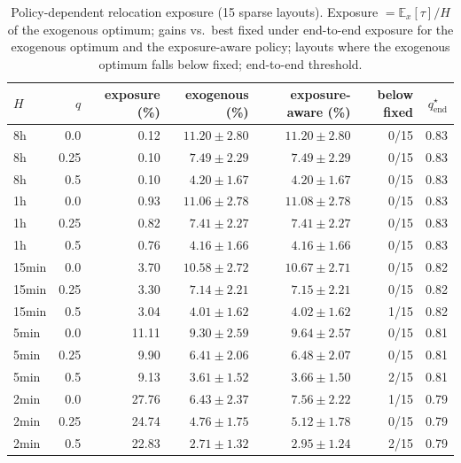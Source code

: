 \begin{table}[h]\centering\caption{Policy-dependent relocation exposure (15 sparse layouts). Exposure $=\mathbb{E}_x[\tau]/H$ of the exogenous optimum; gains vs.\ best fixed under end-to-end exposure for the exogenous optimum and the exposure-aware policy; layouts where the exogenous optimum falls below fixed; end-to-end threshold.}\label{tab:s-reloc}\scriptsize
\begin{tabular}{@{}lrrrrrr@{}}\toprule $H$ & $q$ & exposure (\%) & exogenous (\%) & exposure-aware (\%) & below fixed & $q^\star_{\mathrm{end}}$\\\midrule
8h & 0.0 & 0.12 & $11.20\pm2.80$ & $11.20\pm2.80$ & 0/15 & 0.83\\
8h & 0.25 & 0.10 & $7.49\pm2.29$ & $7.49\pm2.29$ & 0/15 & 0.83\\
8h & 0.5 & 0.10 & $4.20\pm1.67$ & $4.20\pm1.67$ & 0/15 & 0.83\\
1h & 0.0 & 0.93 & $11.06\pm2.78$ & $11.08\pm2.78$ & 0/15 & 0.83\\
1h & 0.25 & 0.82 & $7.41\pm2.27$ & $7.41\pm2.27$ & 0/15 & 0.83\\
1h & 0.5 & 0.76 & $4.16\pm1.66$ & $4.16\pm1.66$ & 0/15 & 0.83\\
15min & 0.0 & 3.70 & $10.58\pm2.72$ & $10.67\pm2.71$ & 0/15 & 0.82\\
15min & 0.25 & 3.30 & $7.14\pm2.21$ & $7.15\pm2.21$ & 0/15 & 0.82\\
15min & 0.5 & 3.04 & $4.01\pm1.62$ & $4.02\pm1.62$ & 1/15 & 0.82\\
5min & 0.0 & 11.11 & $9.30\pm2.59$ & $9.64\pm2.57$ & 0/15 & 0.81\\
5min & 0.25 & 9.90 & $6.41\pm2.06$ & $6.48\pm2.07$ & 0/15 & 0.81\\
5min & 0.5 & 9.13 & $3.61\pm1.52$ & $3.66\pm1.50$ & 2/15 & 0.81\\
2min & 0.0 & 27.76 & $6.43\pm2.37$ & $7.56\pm2.22$ & 1/15 & 0.79\\
2min & 0.25 & 24.74 & $4.76\pm1.75$ & $5.12\pm1.78$ & 0/15 & 0.79\\
2min & 0.5 & 22.83 & $2.71\pm1.32$ & $2.95\pm1.24$ & 2/15 & 0.79\\
\bottomrule\end{tabular}\end{table}
